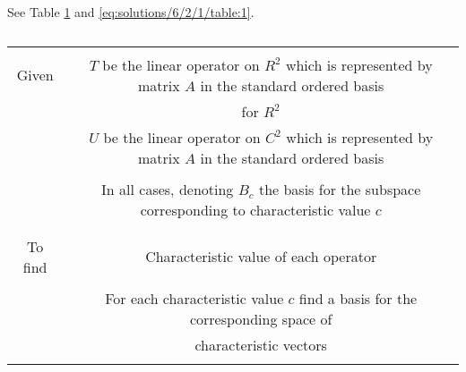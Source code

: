 See Table \ref{eq:solutions/6/2/1/table:0} and \ref{eq:solutions/6/2/1/table:1}.


\begin{table}[ht!]
\begin{center}
\begin{tabular}{|c|c|}
\hline
& \\
Given & $T$ be the linear operator on $R^2$ which is represented by matrix $A$ in the standard ordered basis\\
& for $R^2$\\
& $U$ be the linear operator on $C^2$ which is represented by matrix $A$ in the standard ordered basis\\
&\\
& In all cases, denoting $B_c$ the basis for the subspace corresponding to characteristic value $c$ \\
& \\
\hline
& \\
To find & Characteristic value of each operator\\
& \\
& For each characteristic value $c$ find a basis for the corresponding space of\\
& characteristic vectors \\
& \\
\hline
\end{tabular}
\end{center}
\caption{}
\label{eq:solutions/6/2/1/table:0}
\end{table}
